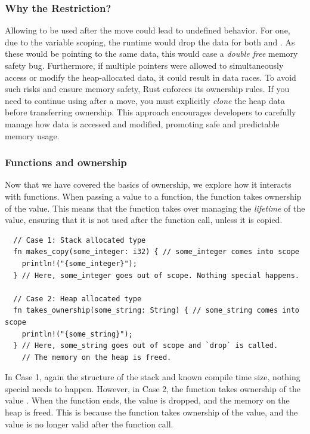 \documentclass[11pt]{report}
\theoremstyle{definition}
\theoremstyle{plain}
\begin{document}
\subsubsection{Why the Restriction?}

Allowing  to be used after the move could lead to undefined behavior. For one, due to the variable scoping, the runtime would drop the data for both  and . As these would be pointing to the same data, this would case a \textit{double free} memory safety bug. Furthermore, if multiple pointers were allowed to simultaneously access or modify the heap-allocated data, it could result in data races. To avoid such risks and ensure memory safety, Rust enforces its ownership rules. If you need to continue using  after a move, you must explicitly \textit{clone} the heap data before transferring ownership. This approach encourages developers to carefully manage how data is accessed and modified, promoting safe and predictable memory usage.

\subsubsection{Functions and ownership}\label{sub:rustlifetimes} %
Now that we have covered the basics of ownership, we explore how it interacts with functions. When passing a value to a function, the function takes ownership of the value. This means that the function takes over managing the \textit{lifetime} of the value, ensuring that it is not used after the function call, unless it is copied.
\begin{verbatim}
  // Case 1: Stack allocated type
  fn makes_copy(some_integer: i32) { // some_integer comes into scope
    println!("{some_integer}");
  } // Here, some_integer goes out of scope. Nothing special happens.

  // Case 2: Heap allocated type
  fn takes_ownership(some_string: String) { // some_string comes into scope
    println!("{some_string}");
  } // Here, some_string goes out of scope and `drop` is called.
    // The memory on the heap is freed.
\end{verbatim}

In Case 1, again the structure of the stack and known compile time size, nothing special needs to happen. However, in Case 2, the function  takes ownership of the  value . When the function ends, the  value is dropped, and the memory on the heap is freed. This is because the function takes ownership of the value, and the value is no longer valid after the function call.
\end{document}
